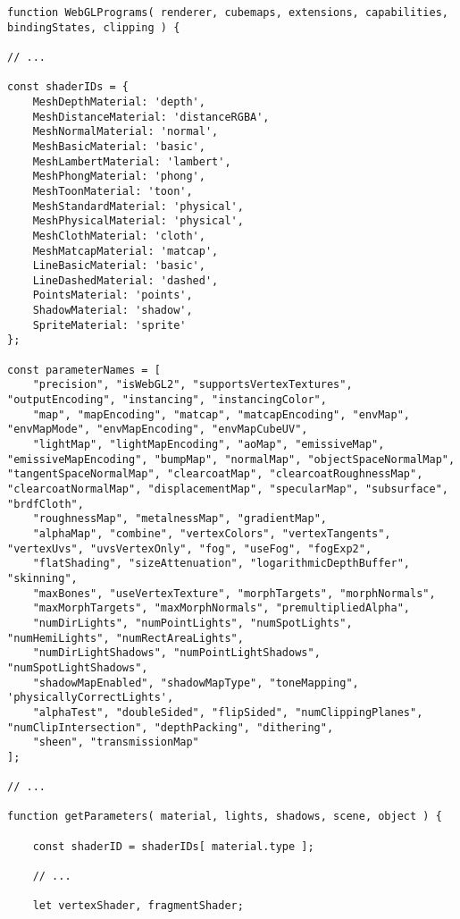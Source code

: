     \begin{lstlisting}[caption=Clase MeshClothMaterial]
function WebGLPrograms( renderer, cubemaps, extensions, capabilities, bindingStates, clipping ) {

// ...

const shaderIDs = {
    MeshDepthMaterial: 'depth',
    MeshDistanceMaterial: 'distanceRGBA',
    MeshNormalMaterial: 'normal',
    MeshBasicMaterial: 'basic',
    MeshLambertMaterial: 'lambert',
    MeshPhongMaterial: 'phong',
    MeshToonMaterial: 'toon',
    MeshStandardMaterial: 'physical',
    MeshPhysicalMaterial: 'physical',
    MeshClothMaterial: 'cloth',
    MeshMatcapMaterial: 'matcap',
    LineBasicMaterial: 'basic',
    LineDashedMaterial: 'dashed',
    PointsMaterial: 'points',
    ShadowMaterial: 'shadow',
    SpriteMaterial: 'sprite'
};

const parameterNames = [
    "precision", "isWebGL2", "supportsVertexTextures", "outputEncoding", "instancing", "instancingColor",
    "map", "mapEncoding", "matcap", "matcapEncoding", "envMap", "envMapMode", "envMapEncoding", "envMapCubeUV",
    "lightMap", "lightMapEncoding", "aoMap", "emissiveMap", "emissiveMapEncoding", "bumpMap", "normalMap", "objectSpaceNormalMap", "tangentSpaceNormalMap", "clearcoatMap", "clearcoatRoughnessMap", "clearcoatNormalMap", "displacementMap", "specularMap", "subsurface", "brdfCloth",
    "roughnessMap", "metalnessMap", "gradientMap",
    "alphaMap", "combine", "vertexColors", "vertexTangents", "vertexUvs", "uvsVertexOnly", "fog", "useFog", "fogExp2",
    "flatShading", "sizeAttenuation", "logarithmicDepthBuffer", "skinning",
    "maxBones", "useVertexTexture", "morphTargets", "morphNormals",
    "maxMorphTargets", "maxMorphNormals", "premultipliedAlpha",
    "numDirLights", "numPointLights", "numSpotLights", "numHemiLights", "numRectAreaLights",
    "numDirLightShadows", "numPointLightShadows", "numSpotLightShadows",
    "shadowMapEnabled", "shadowMapType", "toneMapping", 'physicallyCorrectLights',
    "alphaTest", "doubleSided", "flipSided", "numClippingPlanes", "numClipIntersection", "depthPacking", "dithering",
    "sheen", "transmissionMap"
];

// ...

function getParameters( material, lights, shadows, scene, object ) {

    const shaderID = shaderIDs[ material.type ];

    // ...

    let vertexShader, fragmentShader;


\end{lstlisting}
